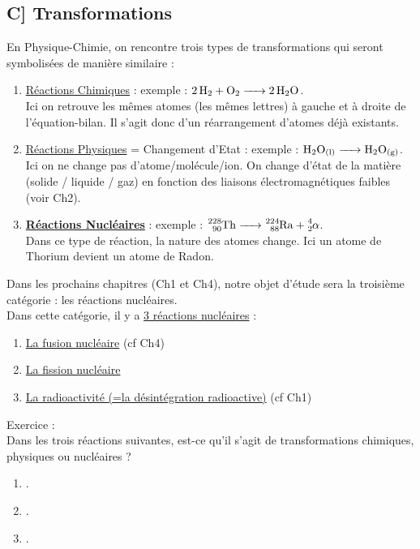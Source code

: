 \documentclass[a4paper]{article}
\begin{document}
\begin{Large}
\section*{C] Transformations}
En Physique-Chimie, on rencontre trois types de transformations qui seront symbolisées de manière similaire :
\begin{enumerate}
\item \underline{Réactions Chimiques} : exemple : {\huge $\ce{2 H_2 + O_2 -> 2 H_2O}$}.\\
Ici on retrouve les mêmes atomes (les mêmes lettres) à gauche et à droite de l'équation-bilan. Il s'agit donc d'un réarrangement d'atomes déjà existants.\\
\item \underline{Réactions Physiques} = Changement d'Etat : exemple : {\huge $\ce{H_2O_{(l)} -> H_2O_{(g)}}$}.\\
Ici on ne change pas d'atome/molécule/ion. On change d'état de la matière (solide / liquide / gaz) en fonction des liaisons électromagnétiques faibles (voir Ch2).\\
\item \underline{\textbf{Réactions Nucléaires}} : exemple : {\huge $\ce{^{228}_{90}Th -> ^{224}_{88}Ra + ^4_2\alpha}$}.\\
Dans ce type de réaction, la nature des atomes change. Ici un atome de Thorium devient un atome de Radon.\\
\end{enumerate}

\noindent Dans les prochains chapitres (Ch1 et Ch4), notre objet d'étude sera la troisième catégorie : les réactions nucléaires.\\ 
Dans cette catégorie, il y a \underline{3 réactions nucléaires} :
\begin{enumerate}
\item \underline{La fusion nucléaire} (cf Ch4)
\item \underline{La fission nucléaire}
\item \underline{La radioactivité (=la désintégration radioactive)} (cf Ch1)\\
\end{enumerate}

\vfill

\noindent Exercice :\\
Dans les trois réactions suivantes, est-ce qu'il s'agit de transformations chimiques, physiques ou nucléaires ?
\begin{enumerate}
\item {}.
\item {}.
\item {}.
\end{enumerate}



\end{Large}
\end{document}
